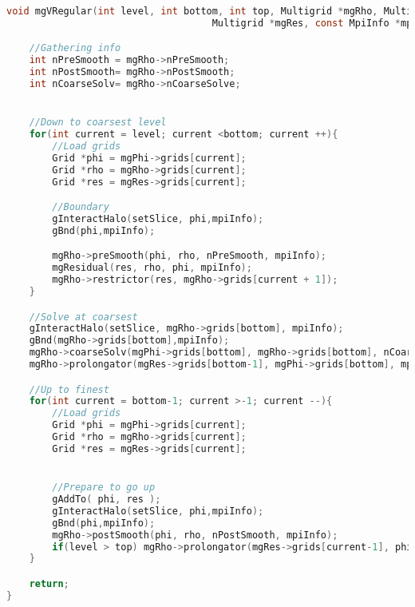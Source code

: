 \newpage
\begin{lstlisting}[language=c, caption = Implementation of an recursive V-cycle]
void mgVRegular(int level, int bottom, int top, Multigrid *mgRho, Multigrid *mgPhi,
 									Multigrid *mgRes, const MpiInfo *mpiInfo){

	//Gathering info
	int nPreSmooth = mgRho->nPreSmooth;
	int nPostSmooth= mgRho->nPostSmooth;
	int nCoarseSolv= mgRho->nCoarseSolve;


	//Down to coarsest level
	for(int current = level; current <bottom; current ++){
		//Load grids
		Grid *phi = mgPhi->grids[current];
		Grid *rho = mgRho->grids[current];
		Grid *res = mgRes->grids[current];

		//Boundary
		gInteractHalo(setSlice, phi,mpiInfo);
		gBnd(phi,mpiInfo);

		mgRho->preSmooth(phi, rho, nPreSmooth, mpiInfo);
		mgResidual(res, rho, phi, mpiInfo);
		mgRho->restrictor(res, mgRho->grids[current + 1]);
	}

	//Solve at coarsest
	gInteractHalo(setSlice, mgRho->grids[bottom], mpiInfo);
	gBnd(mgRho->grids[bottom],mpiInfo);
	mgRho->coarseSolv(mgPhi->grids[bottom], mgRho->grids[bottom], nCoarseSolv, mpiInfo);
	mgRho->prolongator(mgRes->grids[bottom-1], mgPhi->grids[bottom], mpiInfo);

	//Up to finest
	for(int current = bottom-1; current >-1; current --){
		//Load grids
		Grid *phi = mgPhi->grids[current];
		Grid *rho = mgRho->grids[current];
		Grid *res = mgRes->grids[current];


		//Prepare to go up
		gAddTo( phi, res );
		gInteractHalo(setSlice, phi,mpiInfo);
		gBnd(phi,mpiInfo);
		mgRho->postSmooth(phi, rho, nPostSmooth, mpiInfo);
		if(level > top)	mgRho->prolongator(mgRes->grids[current-1], phi, mpiInfo);
	}

	return;
}
\end{lstlisting}


